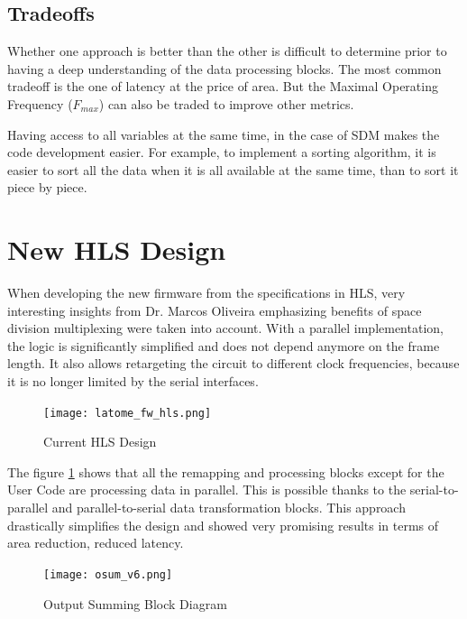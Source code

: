 \subsection{Tradeoffs}\label{sec:space-versus-time-division-multiplexing}
Whether one approach is better than the other is difficult to determine prior to having a deep understanding of the data processing blocks. The most common tradeoff is the one of latency at the price of area. But the Maximal Operating Frequency (\(F_{max}\)) can also be traded to improve other metrics.

Having access to all variables at the same time, in the case of SDM makes the code development easier. For example, to implement a sorting algorithm, it is easier to sort all the data when it is all available at the same time, than to sort it piece by piece.

\section{New HLS Design}\label{sec:current-hls-design}
When developing the new firmware from the specifications in HLS, very interesting insights from Dr. Marcos Oliveira emphasizing benefits of space division multiplexing were taken into account. With a parallel implementation, the logic is significantly simplified and does not depend anymore on the frame length. It also allows retargeting the circuit to different clock frequencies, because it is no longer limited by the serial interfaces.

\begin{figure}
    \centering
    \texttt{[image: latome\_fw\_hls.png]}
    \caption{Current HLS Design}
    \label{fig:current-HLS-design}
\end{figure}

The figure \ref{fig:current-HLS-design} shows that all the remapping and processing blocks except for the User Code are processing data in parallel. This is possible thanks to the serial-to-parallel and parallel-to-serial data transformation blocks. This approach drastically simplifies the design and showed very promising results in terms of area reduction, reduced latency.

\begin{figure}
    \centering
    \texttt{[image: osum\_v6.png]}
    \caption{Output Summing Block Diagram}
    \label{fig:osum-v6}
\end{figure}

